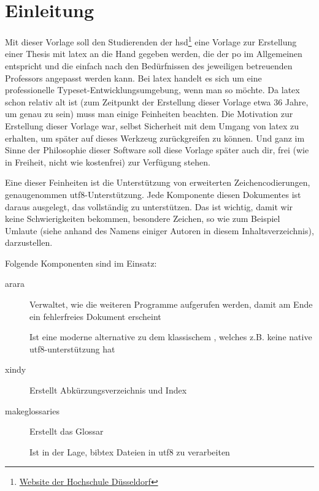 \newpage

\section{Einleitung}%
\label{sec:einl}
Mit dieser Vorlage soll den Studierenden der \gls{hsd}\footnote{\href{https://www.hs-duesseldorf.de}{Website der Hochschule Düsseldorf}} eine Vorlage zur Erstellung einer Thesis mit \gls{latex} an die Hand gegeben werden, die der \gls{po} im Allgemeinen entspricht und die einfach nach den Bedürfnissen des jeweiligen betreuenden Professors angepasst werden kann. Bei \gls{latex} handelt es sich um eine \glqq professionelle Typeset-Entwicklungsumgebung\grqq, wenn man so möchte. Da \gls{latex} schon
relativ alt ist (zum Zeitpunkt der Erstellung dieser Vorlage etwa 36 Jahre, um genau zu sein) muss man einige Feinheiten beachten. Die Motivation zur Erstellung dieser Vorlage war, selbst Sicherheit mit dem Umgang von \gls{latex} zu erhalten, um später auf dieses Werkzeug zurückgreifen zu können. Und ganz im Sinne der Philosophie dieser Software soll diese Vorlage später auch dir, frei (wie in Freiheit, nicht wie kostenfrei) zur Verfügung stehen.

Eine dieser Feinheiten ist die Unterstützung von erweiterten Zeichencodierungen, genaugenommen \gls{utf8}-Unterstützung.
Jede Komponente diesen Dokumentes ist daraus ausgelegt, das vollständig zu unterstützen. Das ist wichtig, damit wir keine Schwierigkeiten bekommen, \glqq besondere Zeichen\grqq, so wie zum Beispiel Umlaute (siehe anhand des Namens einiger Autoren in diesem Inhaltsverzeichnis), darzustellen.

Folgende Komponenten sind im Einsatz:
\begin{description}
  \item[arara] Verwaltet, wie die weiteren Programme aufgerufen werden, damit am Ende ein fehlerfreies Dokument erscheint
  \item[\protect{}] Ist eine moderne alternative zu dem klassischem \glqq {}\grqq , welches z.B. keine native \gls{utf8}-unterstützung hat
  \item[xindy] Erstellt Abkürzungsverzeichnis und Index
  \item[makeglossaries] Erstellt das Glossar
  \item[\protect{}] Ist in der Lage, bibtex Dateien in \gls{utf8} zu verarbeiten
\end{description}

